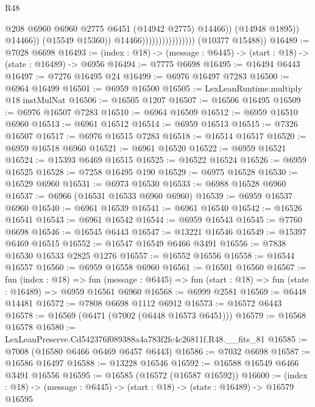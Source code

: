 \begin{lexlean}{R48}
\begin{coremodule}
                                                  @208
                                                  @6960
                                                  @6960
                                                  @2775
                                                  @6451
                                                  (@14942 @2775)
                                                  @14466))
                                              (@14948 @1895))
                                            @14466))
                                        (@15549 @15360))
                                      @14466))))))))))))))))
      (@10377 @15488))
@16489 := @7028 @6698
@16493 := (index : @18) -> (message : @6445) -> (start : @18) -> (state : @16489) -> @6956
@16494 := @7775 @6698
@16495 := @16494 @6443
@16497 := @7276 @16495 @24
@16499 := @6976 @16497 @7283
@16500 := @6964 @16499
@16501 := @6959 @16500
@16505 := LexLeanRuntime.multiply @18 instMulNat
@16506 := @16505 @1207
@16507 := @16506 @16495
@16509 := @6976 @16507 @7283
@16510 := @6964 @16509
@16512 := @6959 @16510 @6960
@16513 := @6961 @16512
@16514 := @6959 @16513
@16515 := @7326 @16507
@16517 := @6976 @16515 @7283
@16518 := @16514 @16517
@16520 := @6959 @16518 @6960
@16521 := @6961 @16520
@16522 := @6959 @16521
@16524 := @15393 @6469 @16515
@16525 := @16522 @16524
@16526 := @6959 @16525
@16528 := @7258 @16495 @190
@16529 := @6975 @16528
@16530 := @16529 @6960
@16531 := @6973 @16530
@16533 := @6988 @16528 @6960
@16537 := @6966 (@16531 @16533 @6960 @6960)
@16539 := @6959 @16537 @6960
@16540 := @6961 @16539
@16541 := @6961 @16540
@16542 := @16526 @16541
@16543 := @6961 @16542
@16544 := @6959 @16543
@16545 := @7760 @6698
@16546 := @16545 @6443
@16547 := @13221 @16546
@16549 := @15397 @6469 @16515
@16552 := @16547 @16549 @6466 @3491
@16556 := @7838 @16530 @16533 @2825 @1276
@16557 := @16552 @16556
@16558 := @16544 @16557
@16560 := @6959 @16558 @6960
@16561 := @16501 @16560
@16567 := fun (index : @18) =>
  fun (message : @6445) => fun (start : @18) => fun (state : @16489) => @6959 @16561 @6960
@16568 := @6999 @2581
@16569 := @6448 @14481
@16572 := @7808 @6698 @1112 @6912
@16573 := @16572 @6443
@16578 := @16569 (@6471 (@7002 (@6448 @16573 @6451)))
@16579 := @16568 @16578
@16580 := LexLeanPreserve.Cd542376f089388a4a783f2fc4c26811f.R48.__fits_81
@16585 := @7008 (@16580 @6466 @6469 @6457 @6443)
@16586 := @7032 @6698
@16587 := @16586 @16497
@16588 := @13228 @16546
@16592 := @16588 @16549 @6466 @3491 @16556
@16595 := @16585 (@16572 (@16587 @16592))
@16600 := (index : @18) -> (message : @6445) -> (start : @18) -> (state : @16489) -> @16579 @16595

\end{coremodule}
\end{lexlean}
